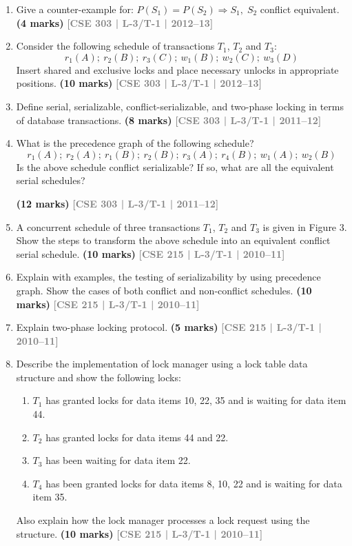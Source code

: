\documentclass[12pt,a3paper]{article}
\newcommand{\yr}[1]{\hfill\textcolor{gray}{\small\textbf{[#1]}}}
\newcommand{\mk}[1]{\textcolor{orange!70!black}{\small\textbf{(#1 marks)}}}
\begin{document}
\begin{enumerate}
\mk{10} \yr{CSE 303 | L-3/T-1 | 2012--13}

\item Give a counter-example for: $P(S_1) = P(S_2) \Rightarrow S_1,\;S_2$ conflict equivalent.
\mk{4} \yr{CSE 303 | L-3/T-1 | 2012--13}

\item Consider the following schedule of transactions $T_1$, $T_2$ and $T_3$:
\[r_1(A);\ r_2(B);\ r_3(C);\ w_1(B);\ w_2(C);\ w_3(D)\]
Insert shared and exclusive locks and place necessary unlocks in appropriate positions.
\mk{10} \yr{CSE 303 | L-3/T-1 | 2012--13}

\item Define serial, serializable, conflict-serializable, and two-phase locking in terms of database transactions.
\mk{8} \yr{CSE 303 | L-3/T-1 | 2011--12}

\item What is the precedence graph of the following schedule?
\[r_1(A);\ r_2(A);\ r_1(B);\ r_2(B);\ r_3(A);\ r_4(B);\ w_1(A);\ w_2(B)\]
Is the above schedule conflict serializable? If so, what are all the equivalent serial schedules?

\mk{12} \yr{CSE 303 | L-3/T-1 | 2011--12}

\item A concurrent schedule of three transactions $T_1$, $T_2$ and $T_3$ is given in Figure 3. Show the steps to transform the above schedule into an equivalent conflict serial schedule.
\mk{10} \yr{CSE 215 | L-3/T-1 | 2010--11}

\item Explain with examples, the testing of serializability by using precedence graph. Show the cases of both conflict and non-conflict schedules.
\mk{10} \yr{CSE 215 | L-3/T-1 | 2010--11}

\item Explain two-phase locking protocol.
\mk{5} \yr{CSE 215 | L-3/T-1 | 2010--11}

\item Describe the implementation of lock manager using a lock table data structure and show the following locks:
\begin{enumerate}
  \item $T_1$ has granted locks for data items 10, 22, 35 and is waiting for data item 44.
  \item $T_2$ has granted locks for data items 44 and 22.
  \item $T_3$ has been waiting for data item 22.
  \item $T_4$ has been granted locks for data items 8, 10, 22 and is waiting for data item 35.
\end{enumerate}
Also explain how the lock manager processes a lock request using the structure.
\mk{10} \yr{CSE 215 | L-3/T-1 | 2010--11}


\end{enumerate}
\end{document}
